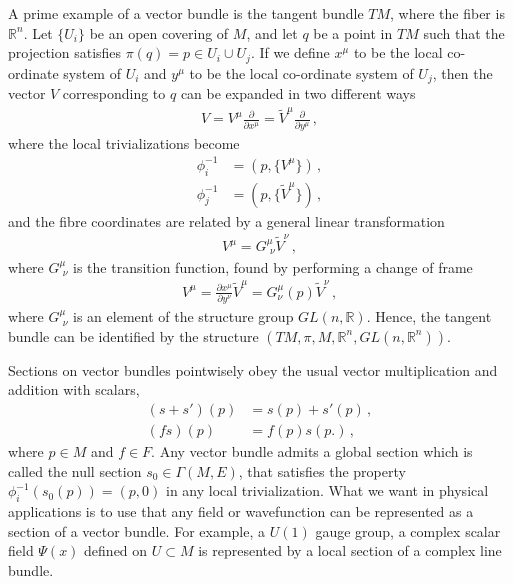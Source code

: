 A prime example of a vector bundle is the tangent bundle $TM$, where the fiber is $\mathbb{R}^{n}$. Let $\{U_i\}$ be an open covering of $M$, and let $q$ be a point in $TM$ such that the projection satisfies $\pi(q)=p\in U_{i}\cup U_{j}$. If we define $x^{\mu}$ to be the local co-ordinate system of $U_i$ and $y^{\mu}$ to be the local co-ordinate system of $U_j$, then the vector $V$ corresponding to $q$ can be expanded in two different ways
\begin{align}
    V=V^{\mu}\frac{\partial}{\partial x^{\mu}}=\tilde{V}^{\mu}\frac{\partial}{\partial y^{\mu}}\,,
\end{align}
where the local trivializations become
\begin{align}
    \phi_{i}^{-1}&=(p,\{V^{\mu}\})\,,
    \\
    \phi_{j}^{-1}&=(p,\{\tilde{V}^{\mu}\})\,,
\end{align}
and the fibre coordinates are related by a general linear transformation
\begin{align}
     V^{\mu}=G^{\mu}_{\,\,\nu}\tilde{V}^{\nu}\,,
\end{align}
where $G^{\mu}_{\,\,\nu}$ is the transition function, found by performing a change of frame
\begin{align}
    V^{\mu}=\frac{\partial x^{\mu}}{\partial y^{\nu}}\tilde{V}^{\mu}=G^{\mu}_{\nu}(p)\tilde{V}^{\nu}\,,
\end{align}
where $G^{\mu}_{\,\,\nu}$ is an element of the structure group $GL(n,\mathbb{R})$. Hence, the tangent bundle can be identified by the structure $(TM,\pi,M,\mathbb{R}^{n},GL(n,\mathbb{R}^{n}))$.

Sections on vector bundles pointwisely obey the usual vector multiplication and addition with scalars,
\begin{align}
    (s+s')(p)&=s(p)+s'(p)\,,
    \\
    (fs)(p)&=f(p)s(p.)\,,
\end{align}
where $p\in M$ and $f\in F$. Any vector bundle admits a global section which is called the null section $s_{0}\in \Gamma(M,E)$, that satisfies the property $\phi_{i}^{-1}(s_{0}(p))=(p,0)$ in any local trivialization. What we want in physical applications is to use that any field or wavefunction can be represented as a section of a vector bundle. For example, a $U(1)$ gauge group, a complex scalar field $\Psi(x)$ defined on $U\subset M$ is represented by a local section of a complex line bundle.

